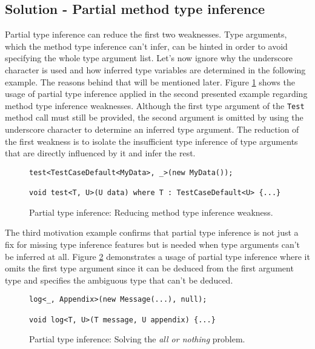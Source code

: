\subsection{Solution - Partial method type inference}

Partial type inference can reduce the first two weaknesses. 
Type arguments, which the method type inference can’t infer, can be hinted in order to avoid specifying the whole type argument list. 
Let’s now ignore why the underscore character is used and how inferred type variables are determined in the following example. 
The reasons behind that will be mentioned later.
Figure \ref{img32:sol1} shows the usage of partial type inference applied in the second presented example regarding method type inference weaknesses. 
Although the first type argument of the \texttt{Test} method call must still be provided, the second argument is omitted by using the underscore character to determine an inferred type argument. 
The reduction of the first weakness is to isolate the insufficient type inference of type arguments that are directly influenced by it and infer the rest.
\begin{figure}[h]
\begin{lstlisting}[style=csharp]
test<TestCaseDefault<MyData>, _>(new MyData());

void test<T, U>(U data) where T : TestCaseDefault<U> {...}
\end{lstlisting}
\caption{Partial type inference: Reducing method type inference weakness.}
\label{img32:sol1}
\end{figure}
\par
The third motivation example confirms that partial type inference is not just a fix for missing type inference features but is needed when type arguments can’t be inferred at all. 
Figure \ref{img33:sol2} demonstrates a usage of partial type inference where it omits the first type argument since it can be deduced from the first argument type and specifies the ambiguous type that can’t be deduced.
\begin{figure}[h]
\begin{lstlisting}[style=csharp]
log<_, Appendix>(new Message(...), null);

void log<T, U>(T message, U appendix) {...}
\end{lstlisting}
\caption{Partial type inference: Solving the \textit{all or nothing} problem.}
\label{img33:sol2}
\end{figure}

\newpage

